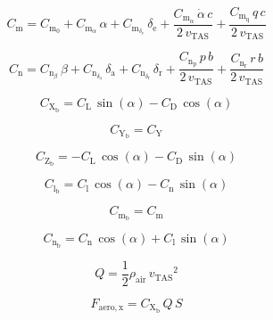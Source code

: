 \documentclass{article}
\begin{document}
\begin{dmath}
C_{\mathrm{m}}=C_{\mathrm{m}_{0}}+C_{\mathrm{m}_{\alpha}}\,\alpha +C_{\mathrm{m}_{\delta_{\mathrm{e}}}}\,\delta _{\mathrm{e}}+\frac{C_{\mathrm{m}_{\dot{\alpha}}}\,\dot{\alpha }\,c}{2\,v_{\mathrm{TAS}}}+\frac{C_{\mathrm{m}_{\mathrm{q}}}\,q\,c}{2\,v_{\mathrm{TAS}}}
\end{dmath}

\begin{dmath}
C_{\mathrm{n}}=C_{\mathrm{n}_{\beta}}\,\beta +C_{\mathrm{n}_{\delta_{\mathrm{a}}}}\,\delta _{\mathrm{a}}+C_{\mathrm{n}_{\delta_{\mathrm{r}}}}\,\delta _{\mathrm{r}}+\frac{C_{\mathrm{n}_{\mathrm{p}}}\,p\,b}{2\,v_{\mathrm{TAS}}}+\frac{C_{\mathrm{n}_{\mathrm{r}}}\,r\,b}{2\,v_{\mathrm{TAS}}}
\end{dmath}

\begin{dmath}
C_{\mathrm{X}_{\mathrm{b}}}=C_{\mathrm{L}}\,\sin\left(\alpha \right)-C_{\mathrm{D}}\,\cos\left(\alpha \right)
\end{dmath}

\begin{dmath}
C_{\mathrm{Y}_{\mathrm{b}}}=C_{\mathrm{Y}}
\end{dmath}

\begin{dmath}
C_{\mathrm{Z}_{\mathrm{b}}}=-C_{\mathrm{L}}\,\cos\left(\alpha \right)-C_{\mathrm{D}}\,\sin\left(\alpha \right)
\end{dmath}

\begin{dmath}
C_{\mathrm{l}_{\mathrm{b}}}=C_{\mathrm{l}}\,\cos\left(\alpha \right)-C_{\mathrm{n}}\,\sin\left(\alpha \right)
\end{dmath}

\begin{dmath}
C_{\mathrm{m}_{\mathrm{b}}}=C_{\mathrm{m}}
\end{dmath}

\begin{dmath}
C_{\mathrm{n}_{\mathrm{b}}}=C_{\mathrm{n}}\,\cos\left(\alpha \right)+C_{\mathrm{l}}\,\sin\left(\alpha \right)
\end{dmath}

\begin{dmath}
Q=\frac{1}{2}\rho _{\mathrm{air}}\,{v_{\mathrm{TAS}}}^2
\end{dmath}

\begin{dmath}
F_{\mathrm{aero,x}}=C_{\mathrm{X}_{\mathrm{b}}}\,Q\,S
\end{dmath}
\end{document}
